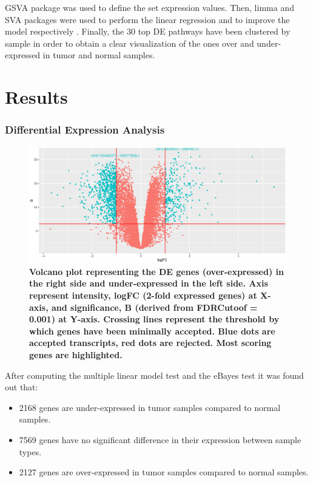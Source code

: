 \documentclass[9pt,twocolumn,twoside]{gsajnl}
\begin{document}
GSVA package \cite{GSVA} was used to define the set expression values. Then, limma  \citep{limma} and SVA packages were used to perform the linear regression and to improve the model respectively \cite{svamanual} . Finally, the 30 top DE pathways have been clustered by sample in order to obtain a clear visualization of the ones over and under-expressed in tumor and normal samples.


\section*{Results}
\subsubsection*{Differential Expression Analysis}

\begin{figure}[!h]
\centering
\includegraphics[width=\linewidth]{Volcano.eps}
\caption{\bf Volcano plot representing the DE genes (over-expressed) in the right side and under-expressed in the left side. Axis represent intensity, logFC (2-fold expressed genes) at X-axis, and significance, B (derived from FDRCutoof = 0.001) at Y-axis. Crossing lines represent the threshold by which genes have been minimally accepted. Blue dots are accepted transcripts, red dots are rejected. Most scoring genes are highlighted.
}

\label{fig:volcano}
\end{figure}

After computing the multiple linear model test and the eBayes test it was found out that:

\begin{itemize}
\item 2168 genes are under-expressed in tumor samples compared to normal samples.
\item 7569 genes have no significant difference in their expression between sample types.
\item 2127 genes are over-expressed in tumor samples compared to normal samples.
\end{itemize}
\end{document}
